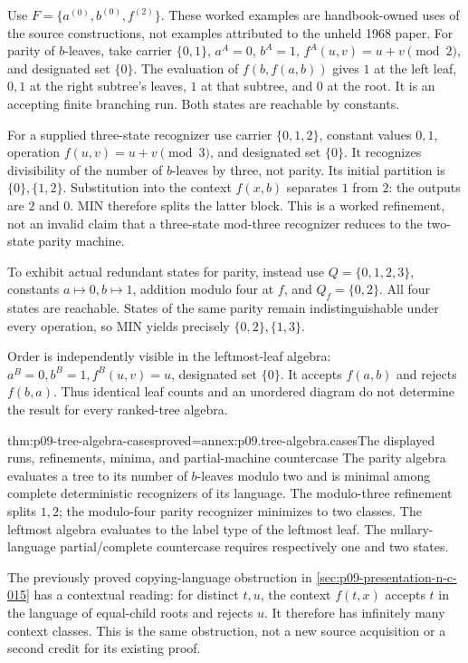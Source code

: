 Use \(F=\{a^{(0)},b^{(0)},f^{(2)}\}\).
These worked examples are handbook-owned uses of the source constructions,
not examples attributed to the unheld 1968 paper.
For parity of \(b\)-leaves, take carrier \(\{0,1\}\),
\(a^A=0\), \(b^A=1\), \(f^A(u,v)=u+v\pmod2\), and designated
set \(\{0\}\).
The evaluation of \(f(b,f(a,b))\) gives \(1\) at the left leaf,
\(0,1\) at the right subtree's leaves, \(1\) at that subtree,
and \(0\) at the root. It is an accepting finite branching run.
Both states are reachable by constants.

For a supplied three-state recognizer use carrier \(\{0,1,2\}\),
constant values \(0,1\), operation \(f(u,v)=u+v\pmod3\), and
designated set \(\{0\}\). It recognizes divisibility of the number
of \(b\)-leaves by three, not parity. Its initial partition is
\(\{0\},\{1,2\}\). Substitution into the context \(f(x,b)\)
separates \(1\) from \(2\): the outputs are \(2\) and \(0\).
MIN therefore splits the latter block. This is a worked refinement,
not an invalid claim that a three-state mod-three recognizer reduces
to the two-state parity machine.

To exhibit actual redundant states for parity, instead use
\(Q=\{0,1,2,3\}\), constants \(a\mapsto0,b\mapsto1\),
addition modulo four at \(f\), and \(Q_f=\{0,2\}\).
All four states are reachable. States of the same parity remain
indistinguishable under every operation, so MIN yields precisely
\(\{0,2\},\{1,3\}\).

Order is independently visible in the leftmost-leaf algebra:
\(a^B=0,b^B=1,f^B(u,v)=u\), designated set \(\{0\}\).
It accepts \(f(a,b)\) and rejects \(f(b,a)\).
Thus identical leaf counts and an unordered diagram do not determine
the result for every ranked-tree algebra.

\begin{hbtheorem}{thm:p09-tree-algebra-cases}{proved=annex:p09.tree-algebra.cases}{The displayed runs, refinements, minima, and partial-machine countercase}
The parity algebra evaluates a tree to its number of \(b\)-leaves modulo
two and is minimal among complete deterministic recognizers of its
language. The modulo-three refinement splits \(1,2\); the modulo-four
parity recognizer minimizes to two classes.
The leftmost algebra evaluates to the label type of the leftmost leaf.
The nullary-language partial/complete countercase requires respectively
one and two states.
\end{hbtheorem}

The previously proved copying-language obstruction in
\cref{sec:p09-presentation-n-c-015} has a contextual reading:
for distinct \(t,u\), the context \(f(t,x)\) accepts \(t\) in the
language of equal-child roots and rejects \(u\). It therefore has
infinitely many context classes. This is the same obstruction, not a
new source acquisition or a second credit for its existing proof.

